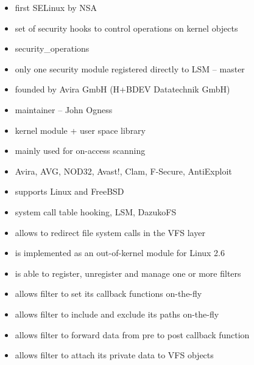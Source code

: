 \documentclass[30pt,a4paper,landscape,headrule,footrule]{foils}
\begin{document}
\begin{itemize}
\item first SELinux by NSA
\item set of security hooks to control operations on kernel objects 
\item security\_operations
\item only one security module registered directly to LSM -- master
\end{itemize}

\begin{itemize}
\item founded by Avira GmbH (H+BDEV Datatechnik GmbH)
\item maintainer -- John Ogness
\item kernel module + user space library
\item mainly used for on-access scanning
\item Avira, AVG, NOD32, Avast!, Clam, F-Secure, AntiExploit
\item supports Linux and FreeBSD
\item system call table hooking, LSM, DazukoFS
\end{itemize}


\begin{itemize}
\item allows to redirect file system calls in the VFS layer
\item is implemented as an out-of-kernel module for Linux 2.6
\item is able to register, unregister and manage one or more filters
\item allows filter to set its callback functions on-the-fly
\item allows filter to include and exclude its paths on-the-fly
\item allows filter to forward data from pre to post callback function
\item allows filter to attach its private data to VFS objects
\end{itemize}
\end{document}
